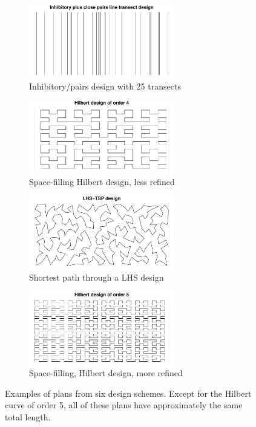 \documentclass[review]{elsarticle}
\begin{document}
\begin{figure}
\begin{subfigure}{2.5in}
\includegraphics[width=2.5in]{../graphics/Inhib000171.pdf}
\caption{Inhibitory/pairs design with 25 transects}
\label{inhib000171}
\end{subfigure}
\begin{subfigure}{2.5in}
\includegraphics[width=2.5in]{../graphics/Hilbert000180.pdf}
\caption{Space-filling Hilbert design, less refined}
\label{hilbert000180}
\end{subfigure}

\begin{subfigure}{2.5in}
\includegraphics[width=2.5in]{../graphics/LHS-TSP000161.pdf}
\caption{Shortest path through a LHS design}
\label{lhstsp000161}
\end{subfigure}
\begin{subfigure}{2.5in}
\includegraphics[width=2.5in]{../graphics/Hilbert000237.pdf}
\caption{Space-filling, Hilbert design, more refined}
\label{hilbert000237}
\end{subfigure}

\caption{Examples of plans from six design schemes. Except for the Hilbert
curve of order 5, all of these plans have approximately the same total length.}
\label{plancomparison}
\end{figure}
\end{document}
